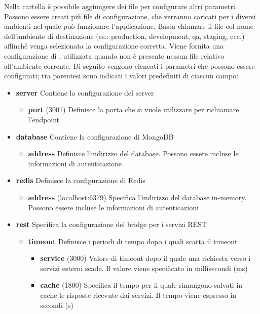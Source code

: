 Nella cartella  è possibile aggiungere dei file per configurare altri parametri. Possono essere creati più file di configurazione, che verranno caricati per i diversi ambienti nel quale può funzionare l'applicazione. Basta chiamare il file col nome dell'ambiente di destinazione (es.: production, development, qa, staging, ecc.) affinché venga selezionata la configurazione corretta. Viene fornita una configurazione di , utilizzata quando non è presente nessun file relativo all'ambiente corrente. Di seguito vengono elencati i parametri che possono essere configurati; tra parentesi sono indicati i valori predefiniti di ciascun campo:

\begin{itemize}
	\item \textbf{server}
	Contiene la configurazione del server
	\begin{itemize}
		\item \textbf{port}
		(3001) Definisce la porta che si vuole utilizzare per richiamare l'endpoint
	\end{itemize}
	\item \textbf{database}
	Contiene la configurazione di MongoDB
	\begin{itemize}
		\item \textbf{address}
		Definisce l'indirizzo del database. Possono essere incluse le informazioni di autenticazione
	\end{itemize}
	\item \textbf{redis}
	Definisce la configurazione di Redis
	\begin{itemize}
		\item \textbf{address}
		(localhost:6379) Specifica l'indirizzo del database in-memory. Possono essere incluse le informazioni di autenticazioni
	\end{itemize}
	\item \textbf{rest}
	Specifica la configurazione del bridge per i servizi REST
	\begin{itemize}
		\item \textbf{timeout}
		Definisce i periodi di tempo dopo i quali scatta il timeout
		\begin{itemize}
			\item \textbf{service}
			(3000) Valore di timeout dopo il quale una richiesta verso i servizi esterni scade. Il valore viene specificato in millisecondi (ms)
			\item \textbf{cache}
			(1800) Specifica il tempo per il quale rimangono salvati in cache le risposte ricevute dai servizi. Il tempo viene espresso in secondi (s)

\end{itemize}
\end{itemize}
\end{itemize}
